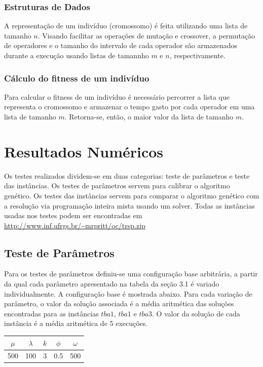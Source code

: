 \documentclass{article}
\begin{document}
\subsubsection{Estruturas de Dados}
\quad A representação de um indivíduo (cromossomo) é feita utilizando uma lista de tamanho $n$. Visando facilitar as operações de mutação e crossover, a permutação de operadores e o tamanho do intervalo de cada operador são armazenados durante a execução usando listas de tamannho $m$ e $n$, respectivamente.

\subsubsection{Cálculo do fitness de um indivíduo}
\quad Para calcular o fitness de um indivíduo é necessário percorrer a lista que representa o cromossomo e armazenar o tempo gasto por cada operador em uma lista de tamanho $m$. Retorna-se, então, o maior valor da lista de tamanho $m$.

\section{Resultados Numéricos}
\quad Os testes realizados dividem-se em duas categorias: teste de parâmetros e teste das instâncias. Os testes de parâmetros servem para calibrar o algoritmo genético. Os testes das instâncias servem para  comparar o algoritmo genético com a resolução via programação inteira mista usando um solver. Todas as instâncias usadas nos testes podem ser encontradas em \url{http://www.inf.ufrgs.br/~mrpritt/oc/trsp.zip}

\subsection{Teste de Parâmetros}
\quad Para os testes de parâmetros  definiu-se uma configuração base arbitrária, a partir da qual cada parâmetro apresentado na tabela da seção 3.1 é variado individualmente. A configuração base é mostrada abaixo. Para cada variação de parâmetro, o valor da solução associada é a média aritmética das soluções encontradas para as instâncias $tba1$, $tba1$ e $tba3$. O valor da solução de cada instância é a média aritmética de 5 execuções.
\begin{table}[!htp]
\centering
\begin{tabular}{ccccc}
\hline
$\mu$ & $\lambda$ & $k$  & $\phi$ & $\omega$ \\ \hline
500 & 100 & 3 & 0.5 & 500 \\ \hline
\end{tabular}
\end{table}
\end{document}

